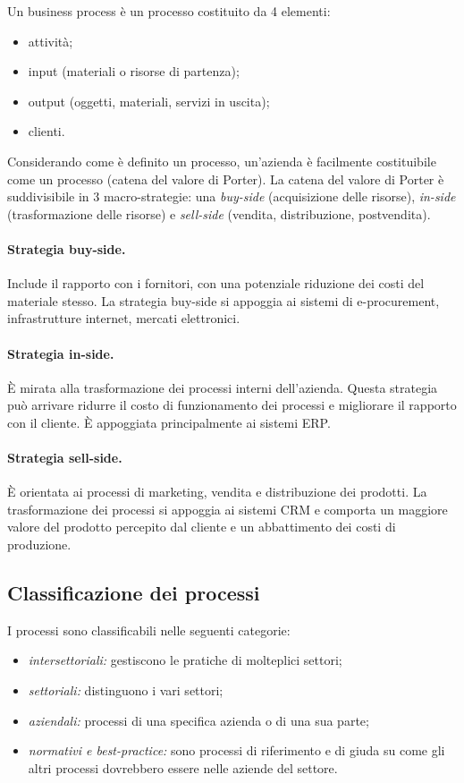 \documentclass[a4paper, 10pt]{article}
\begin{document}
	Un business process è un processo costituito da 4 elementi: \begin{itemize}
		\item attività;
		\item input (materiali o risorse di partenza);
		\item output (oggetti, materiali, servizi in uscita);
		\item clienti.
	\end{itemize}

	Considerando come è definito un processo, un'azienda è facilmente costituibile come un processo (catena del valore di Porter). La catena del valore di Porter è suddivisibile in 3 macro-strategie: una \textit{buy-side} (acquisizione delle risorse), \textit{in-side} (trasformazione delle risorse) e \textit{sell-side} (vendita, distribuzione, postvendita).
	
	\paragraph{Strategia buy-side.} Include il rapporto con i fornitori, con una potenziale riduzione dei costi del materiale stesso. La strategia buy-side si appoggia ai sistemi di e-procurement, infrastrutture internet, mercati elettronici.
	
	\paragraph{Strategia in-side.} È mirata alla trasformazione dei processi interni dell'azienda. Questa strategia può arrivare  ridurre il costo 	di funzionamento dei processi e migliorare il rapporto con il cliente. È appoggiata principalmente ai sistemi ERP.
	
	\paragraph{Strategia sell-side.}È orientata ai processi di marketing, vendita e distribuzione dei prodotti. La trasformazione dei processi si appoggia ai sistemi CRM e comporta un maggiore valore del prodotto percepito dal cliente e un abbattimento dei costi di produzione. 
	
	\subsection{Classificazione dei processi}
	I processi sono classificabili nelle seguenti categorie: \begin{itemize}
		\item \textit{intersettoriali:} gestiscono le pratiche di molteplici settori;
		\item \textit{settoriali:} distinguono i vari settori;
		\item \textit{aziendali:} processi di una specifica azienda o di una sua parte;
		\item \textit{normativi e best-practice:} sono processi di riferimento e di giuda su come gli altri processi dovrebbero essere nelle aziende del settore.
	\end{itemize}
\end{document}
